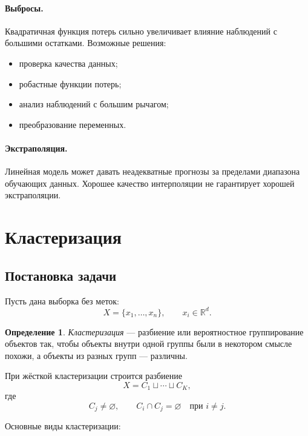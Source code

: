 \documentclass[12pt,a4paper]{article}
\theoremstyle{definition}
\newtheorem{definition}[theorem]{Определение}
\theoremstyle{remark}
\newcommand{\R}{\mathbb{R}}
\begin{document}
\paragraph{Выбросы.}
Квадратичная функция потерь сильно увеличивает влияние наблюдений с большими
остатками. Возможные решения:

\begin{itemize}
    \item проверка качества данных;
    \item робастные функции потерь;
    \item анализ наблюдений с большим рычагом;
    \item преобразование переменных.
\end{itemize}

\paragraph{Экстраполяция.}
Линейная модель может давать неадекватные прогнозы за пределами диапазона
обучающих данных. Хорошее качество интерполяции не гарантирует хорошей
экстраполяции.

\section{Кластеризация}

\subsection{Постановка задачи}

Пусть дана выборка без меток:
\[
    X=\{x_1,\ldots,x_n\},
    \qquad
    x_i\in\R^d.
\]

\begin{definition}
\emph{Кластеризация} --- разбиение или вероятностное группирование объектов
так, чтобы объекты внутри одной группы были в некотором смысле похожи,
а объекты из разных групп --- различны.
\end{definition}

При жёсткой кластеризации строится разбиение
\[
    X=C_1\sqcup\cdots\sqcup C_K,
\]
где
\[
    C_j\ne\varnothing,\qquad
    C_i\cap C_j=\varnothing
    \quad\text{при }i\ne j.
\]

Основные виды кластеризации:
\end{document}
